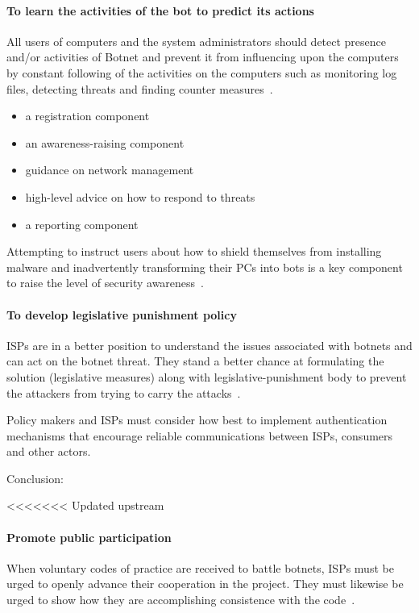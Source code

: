 \paragraph{To learn the activities of the bot to predict its actions}
All users of computers and the system administrators should detect presence and/or activities of Botnet and prevent it from influencing upon the computers by constant following of the activities on the computers such as monitoring log files, detecting threats and finding counter measures~\cite{stankovic2009defense}.

\begin{itemize}
	\item a registration component
	\item an awareness-raising component
	\item guidance on network management
	\item high-level advice on how to respond to threats
	\item a reporting component
\end{itemize}

Attempting to instruct users about how to shield themselves from installing malware and inadvertently transforming their PCs into bots is a key component to raise the level of security awareness~\cite{stankovic2009defense}.


\paragraph{To develop legislative punishment policy}

ISPs are in a better position to understand the issues associated with botnets and can act on the botnet threat. They stand a better chance at formulating the solution (legislative measures) along with legislative-punishment body to prevent the attackers from trying to carry the attacks~\cite{stankovic2009defense}.


Policy makers and ISPs must consider how best to implement authentication mechanisms that encourage reliable communications between ISPs, consumers and other actors.

Conclusion: 

<<<<<<< Updated upstream


\paragraph{Promote public participation}
When voluntary codes of practice are received to battle botnets, ISPs must be urged to openly advance their cooperation in the project. They must likewise be urged to show how they are accomplishing consistence with the code~\cite{OECD}.



